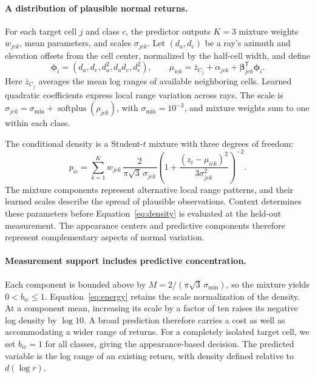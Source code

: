 \documentclass{article}
\begin{document}
\paragraph{A distribution of plausible normal returns.}
For each target cell $j$ and class $c$, the predictor outputs $K=3$ mixture weights $w_{jck}$, mean parameters, and scales $\sigma_{jck}$. Let $(d_a,d_e)$ be a ray's azimuth and elevation offsets from the cell center, normalized by the half-cell width, and define
\begin{equation}
 \boldsymbol\phi_i=(d_a,d_e,d_a^2,d_ad_e,d_e^2),\qquad
 \mu_{ick}=\bar z_{C_j}+\alpha_{jck}
                  +\boldsymbol\beta_{jck}^{\mathsf T}\boldsymbol\phi_i.
 \label{eq:surface}
\end{equation}
Here $\bar z_{C_j}$ averages the mean log ranges of available neighboring cells. Learned quadratic coefficients express local range variation across rays. The scale is $\sigma_{jck}=\sigma_{\min}+\operatorname{softplus}(\rho_{jck})$, with $\sigma_{\min}=10^{-3}$, and mixture weights sum to one within each class.

The conditional density is a Student-$t$ mixture with three degrees of freedom:
\begin{equation}
 p_{ic}=\sum_{k=1}^{K}w_{jck}\,
 \frac{2}{\pi\sqrt3\,\sigma_{jck}}
 \left(1+\frac{(z_i-\mu_{ick})^2}{3\sigma_{jck}^2}\right)^{-2}.
 \label{eq:density}
\end{equation}
The mixture components represent alternative local range patterns, and their learned scales describe the spread of plausible observations. Context determines these parameters before Equation~\eqref{eq:density} is evaluated at the held-out measurement. The appearance centers and predictive components therefore represent complementary aspects of normal variation.

\paragraph{Measurement support includes predictive concentration.}
Each component is bounded above by $M=2/(\pi\sqrt3\,\sigma_{\min})$, so the mixture yields $0<b_{ic}\leq1$. Equation~\eqref{eq:energy} retains the scale normalization of the density. At a component mean, increasing its scale by a factor of ten raises its negative log density by $\log 10$. A broad prediction therefore carries a cost as well as accommodating a wider range of returns. For a completely isolated target cell, we set $b_{ic}=1$ for all classes, giving the appearance-based decision. The predicted variable is the log range of an existing return, with density defined relative to $d(\log r)$.
\end{document}

